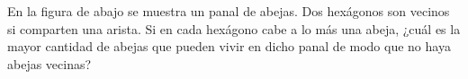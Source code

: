 En la figura de abajo se muestra un panal de abejas. Dos hexágonos son vecinos si comparten una arista. Si en cada hexágono cabe a lo más una abeja, ¿cuál es la mayor cantidad de abejas que pueden vivir en dicho panal de modo que no haya abejas vecinas?